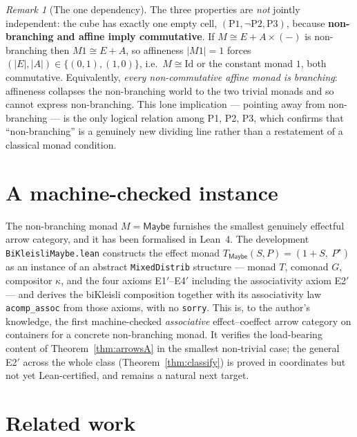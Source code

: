 \documentclass[11pt]{amsart}
\theoremstyle{plain}
\theoremstyle{definition}
\theoremstyle{remark}
\newtheorem{remark}[theorem]{Remark}
\newcommand{\cont}[2]{(#1,#2)}
\newcommand{\Maybe}{\mathsf{Maybe}}
\begin{document}
\begin{remark}[The one dependency]\label{rem:theoremC}
The three properties are \emph{not} jointly independent: the cube has exactly one empty cell,
$(\mathrm{P1},\lnot\mathrm{P2},\mathrm{P3})$, because \textbf{non-branching and affine imply
commutative}. If $M\cong E+A\times(-)$ is non-branching then $M1\cong E+A$, so affineness
$|M1|=1$ forces $(|E|,|A|)\in\{(0,1),(1,0)\}$, i.e.\ $M\cong\mathrm{Id}$ or the constant monad
$1$, both commutative. Equivalently, \emph{every non-commutative affine monad is branching}:
affineness collapses the non-branching world to the two trivial monads and so cannot express
non-branching. This lone implication --- pointing away from non-branching --- is the only
logical relation among P1, P2, P3, which confirms that ``non-branching'' is a genuinely new
dividing line rather than a restatement of a classical monad condition.
\end{remark}

\section{A machine-checked instance}\label{sec:lean}

The non-branching monad $M=\Maybe$ furnishes the smallest genuinely effectful arrow category,
and it has been formalised in Lean~4. The development \texttt{BiKleisliMaybe.lean} constructs
the effect monad $T_{\Maybe}\cont S P=(1+S,\ P^\star)$ as an instance of an abstract
\texttt{MixedDistrib} structure --- monad $T$, comonad $G$, compositor $\kappa$, and the four
axioms E1$'$--E4$'$ including the associativity axiom E2$'$ --- and derives the biKleisli
composition together with its associativity law \texttt{acomp\_assoc} from those axioms, with
no \texttt{sorry}. This is, to the author's knowledge, the first machine-checked
\emph{associative} effect--coeffect arrow category on containers for a concrete non-branching
monad. It verifies the load-bearing content of Theorem~\ref{thm:arrowsA} in the smallest
non-trivial case; the general E2$'$ across the whole class (Theorem~\ref{thm:classify}) is
proved in coordinates but not yet Lean-certified, and remains a natural next target.

\section{Related work}\label{sec:related}
\end{document}
